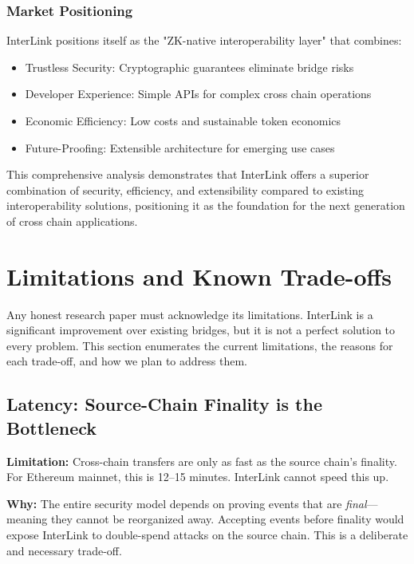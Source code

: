 \documentclass[11pt,a4paper]{article}
\begin{document}
\subsubsection{Market Positioning}

InterLink positions itself as the "ZK-native interoperability layer" that combines:
\begin{itemize}
    \item Trustless Security: Cryptographic guarantees eliminate bridge risks
    \item Developer Experience: Simple APIs for complex cross chain operations
    \item Economic Efficiency: Low costs and sustainable token economics
    \item Future-Proofing: Extensible architecture for emerging use cases
\end{itemize}

This comprehensive analysis demonstrates that InterLink offers a superior combination of security, efficiency, and extensibility compared to existing interoperability solutions, positioning it as the foundation for the next generation of cross chain applications.

\section{Limitations and Known Trade-offs}
\label{sec:limitations}

Any honest research paper must acknowledge its limitations. InterLink is a significant improvement over existing bridges, but it is not a perfect solution to every problem. This section enumerates the current limitations, the reasons for each trade-off, and how we plan to address them.

\subsection{Latency: Source-Chain Finality is the Bottleneck}

\textbf{Limitation:} Cross-chain transfers are only as fast as the source chain's finality. For Ethereum mainnet, this is 12--15 minutes. InterLink cannot speed this up.

\textbf{Why:} The entire security model depends on proving events that are \textit{final}---meaning they cannot be reorganized away. Accepting events before finality would expose InterLink to double-spend attacks on the source chain. This is a deliberate and necessary trade-off.
\end{document}
